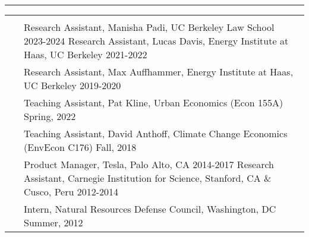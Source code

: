 \documentclass[letterpaper,10pt,oneside]{article}
\newenvironment{myresume}[2]{\pdfbookmark{#1}{#1}{\LARGE{\textbf{#1}}}\vspace{1mm}\hrule\vspace{-2mm}\begin{longtable}{p{0.12\textwidth} p{0.8\textwidth}}&#2}{\end{longtable}}
\renewcommand{\section}[2]{\vspace{-1.5em}\\\pdfbookmark{#1}{#2}{\singlespace\textsc{#1}}&}
\newcommand{\firstentry}[1]{\vspace{0em}\newline#1\vspace{0em}}
\newcommand{\entry}[1]{\vspace{-1em}\\~&#1}
\begin{document}
\begin{myresume}{}
\section{Research \newline Positions}{positions}

\firstentry{Research Assistant, Manisha Padi, UC Berkeley Law School \hfill 2023-2024
\newline Research Assistant, Lucas Davis, Energy Institute at Haas, UC Berkeley \hfill 2021-2022
}



\entry{Research Assistant, Max Auffhammer, Energy Institute at Haas, UC Berkeley \hfill 2019-2020
}



\section{Teaching}{teaching}

\firstentry{Teaching Assistant, Pat Kline, Urban Economics (Econ 155A) \hfill Spring, 2022
}

\entry{Teaching Assistant, David Anthoff, Climate Change Economics (EnvEcon C176) \hfill Fall, 2018
}


\section{Prior \newline Employment}{prior}

\firstentry{Product Manager, Tesla, Palo Alto, CA \hfill 2014-2017
\newline Research Assistant, Carnegie Institution for Science, Stanford, CA \& Cusco, Peru \hfill 2012-2014
}



\entry{Intern, Natural Resources Defense Council, Washington, DC \hfill Summer, 2012
}


\end{myresume}
\end{document}
